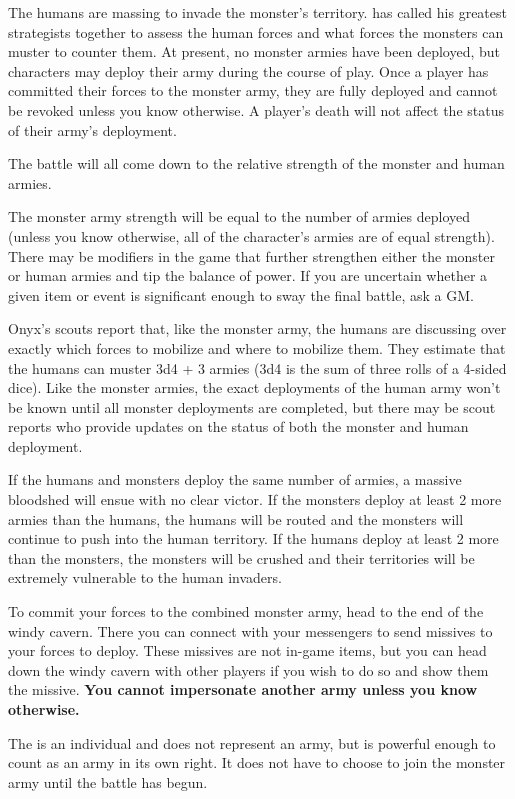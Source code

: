 \documentclass[green]{guildcamp2}
\begin{document}
\name{\gBattle{}}

The humans are massing to invade the monster's territory. \cOnyx{} has called his greatest strategists together to assess the human forces and what forces the monsters can muster to counter them. At present, no monster armies have been deployed, but characters may deploy their army during the course of play. Once a player has committed their forces to the monster army, they are fully deployed and cannot be revoked unless you know otherwise. A player's death will not affect the status of their army's deployment.

The battle will all come down to the relative strength of the monster and human armies.

The monster army strength will be equal to the number of armies deployed (unless you know otherwise, all of the character's armies are of equal strength). There may be modifiers in the game that further strengthen either the monster or human armies and tip the balance of power. If you are uncertain whether a given item or event is significant enough to sway the final battle, ask a GM.

Onyx's scouts report that, like the monster army, the humans are discussing over exactly which forces to mobilize and where to mobilize them. They estimate that the humans can muster 3d4 + 3 armies (3d4 is the sum of three rolls of a 4-sided dice). Like the monster armies, the exact deployments of the human army won't be known until all monster deployments are completed, but there may be scout reports who provide updates on the status of both the monster and human deployment.

If the humans and monsters deploy the same number of armies, a massive bloodshed will ensue with no clear victor. If the monsters deploy at least 2 more armies than the humans, the humans will be routed and the monsters will continue to push into the human territory. If the humans deploy at least 2 more than the monsters, the monsters will be crushed and their territories will be extremely vulnerable to the human invaders.

To commit your forces to the combined monster army, head to the end of the windy cavern. There you can connect with your messengers to send missives to your forces to deploy. These missives are not in-game items, but you can head down the windy cavern with other players if you wish to do so and show them the missive. \textbf{You cannot impersonate another army unless you know otherwise.}

The \cSphinx{} is an individual and does not represent an army, but is powerful enough to count as an army in its own right. It does not have to choose to join the monster army until the battle has begun.
\end{document}
